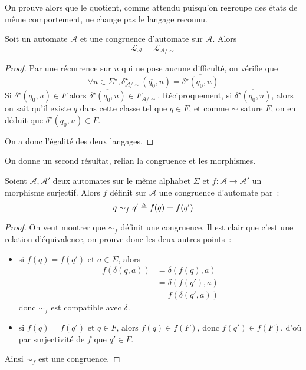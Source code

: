 On prouve alors que le quotient, comme attendu puisqu'on regroupe des états de
même comportement, ne change pas le langage reconnu.

\begin{proposition}
  Soit un automate $\mathcal A$ et une congruence d'automate sur $\mathcal A$.
  Alors
  \[\mathcal L_\mathcal A = \mathcal L_{\mathcal A/\sim}\]
\end{proposition}

\begin{proof}
  Par une récurrence sur $u$ qui ne pose aucune difficulté, on vérifie que
  \[\forall u \in \Sigma^\star,
  \delta^\star_{\mathcal A/\sim}(\overline{q_0},u)=
  \overline{\delta^\star(q_0,u)}\]
  Si $\delta^\star(q_0,u) \in F$ alors
  $\overline{\delta^\star(q_0,u)} \in F_{\mathcal A/\sim}$.
  Réciproquement, si $\overline{\delta^\star(q_0,u)}$, alors on sait qu'il
  existe $q$ dans cette classe tel que $q \in F$, et comme $\sim$ sature $F$,
  on en déduit que $\delta^\star(q_0,u) \in F$.

  On a donc l'égalité des deux langages.
\end{proof}

On donne un second résultat, relian la congruence et les morphismes.

\begin{proposition}
  Soient $\mathcal A, \mathcal A'$ deux automates sur le même alphabet $\Sigma$
  et $f : \mathcal A \to \mathcal A'$ un morphisme surjectif. Alors $f$ définit
  sur $\mathcal A$ une congruence d'automate par~:
  \[q\sim_f q' \triangleq f(q) = f(q')\]
\end{proposition}

\begin{proof}
  On veut montrer que $\sim_f$ définit une congruence. Il est clair que c'est
  une relation d'équivalence, on prouve donc les deux autres points~:
  \begin{itemize}
  \item si $f(q) = f(q')$ et $a \in \Sigma$, alors
    \begin{align*}
      f(\delta(q,a)) &= \delta(f(q),a)\\
      &= \delta(f(q'),a)\\
      &= f(\delta(q',a))
    \end{align*}
    donc $\sim_f$ est compatible avec $\delta$.
  \item si $f(q) = f(q')$ et $q \in F$, alors $f(q) \in f(F)$, donc
    $f(q') \in f(F)$, d'où par surjectivité de $f$ que $q' \in F$.
  \end{itemize}
  Ainsi $\sim_f$ est une congruence.
\end{proof}

